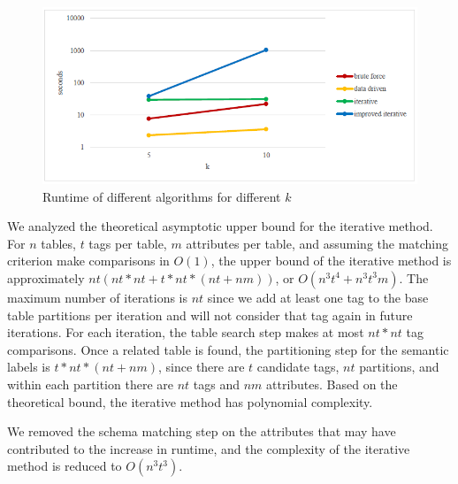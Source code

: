 \begin{figure}
  \centering
  \includegraphics[width=5in]{figures/runtime-of-different-algorithms-for-different-k.png}
  \caption{Runtime of different algorithms for different $k$}
  \label{fig:runtime-of-different-algorithms-for-different-k}
\end{figure}

We analyzed the theoretical asymptotic upper bound for the iterative method. For $n$ tables, $t$ tags per table, $m$ attributes per table, and assuming the matching criterion make comparisons in $O(1)$, the upper bound of the iterative method is approximately $nt(nt*nt+t*nt*(nt+nm))$, or $O(n^3t^4+n^3t^3m)$. The maximum number of iterations is $nt$ since we add at least one tag to the base table partitions per iteration and will not consider that tag again in future iterations. For each iteration, the table search step makes at most $nt*nt$ tag comparisons. Once a related table is found, the partitioning step for the semantic labels is $t*nt*(nt+nm)$, since there are $t$ candidate tags, $nt$ partitions, and within each partition there are $nt$ tags and $nm$ attributes. Based on the theoretical bound, the iterative method has polynomial complexity.

We removed the schema matching step on the attributes that may have contributed to the increase in runtime, and the complexity of the iterative method is reduced to $O(n^3t^3)$.
\endinput